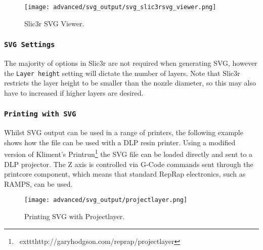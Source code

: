 \begin{figure}[H]
\centering
\texttt{[image: advanced/svg\_output/svg\_slic3rsvg\_viewer.png]}
\caption{Slic3r SVG Viewer.}
\label{fig:svg_slic3rsvg_viewer}
\end{figure}

\subsubsection{\texttt{SVG Settings}} %
\label{sub:svg_settings}

The majority of options in Slic3r are not required when generating SVG, however the \texttt{Layer height} setting will dictate the number of layers.  Note that Slic3r restricts the layer height to be smaller than the nozzle diameter, so this may also have to increased if higher layers are desired.


\subsubsection{\texttt{Printing with SVG}} %
\label{sub:printing_with_svg}

Whilst SVG output can be used in a range of printers, the following example shows how the file can be used with a DLP resin printer.  Using a modified version of Kliment's Printrun\footnote{\	exttt{http://garyhodgson.com/reprap/projectlayer}} the SVG file can be loaded directly and sent to a DLP projector.  The Z axis is controlled via G-Code commands sent through the printcore component, which means that standard RepRap electronics, such as RAMPS, can be used.


\begin{figure}[H]
\centering
\texttt{[image: advanced/svg\_output/projectlayer.png]}
\caption{Printing SVG with Projectlayer.}
\label{fig:projectlayer}
\end{figure}



